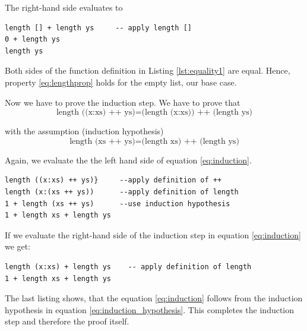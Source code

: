 The right-hand side evaluates to 
\begin{program}
\begin{verbatim}
length [] + length ys     -- apply length []
0 + length ys
length ys
\end{verbatim}
\end{program}

Both sides of the function definition in Listing \ref{lst:equality1} are equal. Hence, property \ref{eq:lengthprop} holds for the empty list, our base case.

Now we have to prove the induction step. We have to prove that
\begin{equation}
  \label{eq:induction}
    \text{length ((x:xs) ++ ys)} = \text{(length (x:xs)) ++ (length ys)}
\end{equation}

with the assumption (induction hypothesis)
\begin{equation}
  \label{eq:induction_hypothesis}
      \text{length (xs ++ ys)} = \text{(length xs) ++ (length ys)}
\end{equation}

Again, we evaluate the the left hand side of equation \ref{eq:induction}.

\begin{program}
\begin{verbatim}
length ((x:xs) ++ ys)}     --apply definition of ++
length (x:(xs ++ ys))      --apply definition of length
1 + length (xs ++ ys)      --use induction hypothesis
1 + length xs + length ys
\end{verbatim}
\end{program}

If we evaluate the right-hand side of the induction step in equation  \ref{eq:induction} we get:
\begin{program}
\begin{verbatim}
length (x:xs) + length ys    -- apply definition of length
1 + length xs + length ys
\end{verbatim}
\end{program}

The last listing shows, that the equation \ref{eq:induction} follows from the induction hypothesis in equation \ref{eq:induction_hypothesis}. This completes the induction step and therefore the proof itself.
